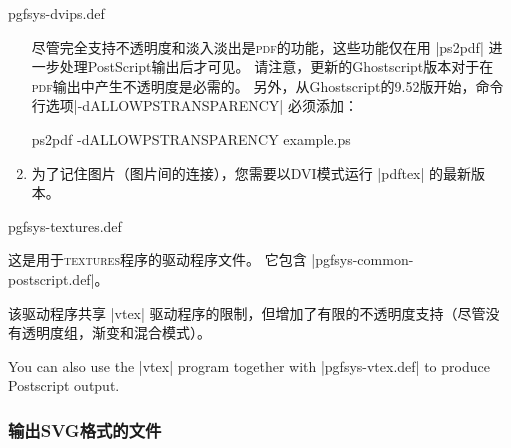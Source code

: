 \begin{filedescription}{pgfsys-dvips.def}
\begin{enumerate}
        尽管完全支持不透明度和淡入淡出是\textsc{pdf}的功能，这些功能仅在用 |ps2pdf| 进一步处理PostScript输出后才可见。 请注意，更新的Ghostscript版本对于在\textsc{pdf}输出中产生不透明度是必需的。 另外，从Ghostscript的9.52版开始，命令行选项|-dALLOWPSTRANSPARENCY| 必须添加：
\begin{codeexample}
ps2pdf -dALLOWPSTRANSPARENCY example.ps
\end{codeexample}
        \item 为了记住图片（图片间的连接），您需要以DVI模式运行 |pdftex| 的最新版本。 
    \end{enumerate}
\end{filedescription}

\begin{filedescription}{pgfsys-textures.def}

    这是用于\textsc{textures}程序的驱动程序文件。 它包含 |pgfsys-common-postscript.def|。


    该驱动程序共享 |vtex| 驱动程序的限制，但增加了有限的不透明度支持（尽管没有透明度组，渐变和混合模式）。
\end{filedescription}

You can also use the |vtex| program together with |pgfsys-vtex.def| to produce Postscript output.


\subsubsection{输出SVG格式的文件}

